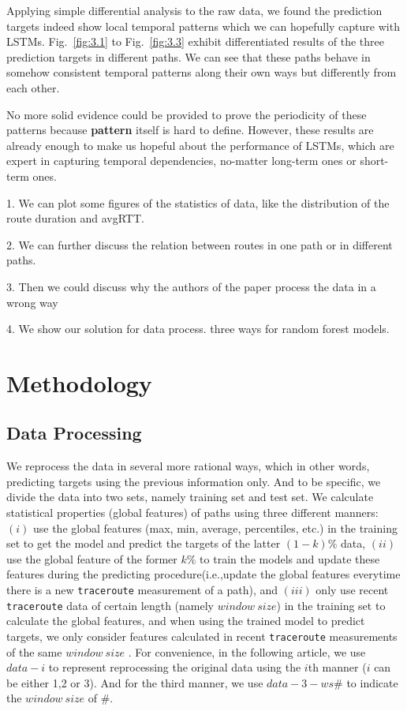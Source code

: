 \documentclass[sigconf]{acmart}
\begin{document}
	Applying simple differential analysis to the raw data, we found the prediction targets indeed show local temporal patterns which we can hopefully capture with LSTMs. Fig.~\ref{fig:3.1} to Fig.~\ref{fig:3.3} exhibit differentiated results of the three prediction targets in different paths. We can see that these paths behave in somehow consistent temporal patterns along their own ways but differently from each other.
	
	No more solid evidence could be provided to prove the periodicity of these patterns because \textbf{pattern} itself is hard to define. However, these results are already enough to make us hopeful about the performance of LSTMs, which are expert in capturing temporal dependencies, no-matter long-term ones or short-term ones.
	
	
	1. We can plot some figures of the statistics of data, like the distribution of the route duration and avgRTT. 
	
	2. We can further discuss the relation between routes in one path or in different paths.
	
	3. Then we could discuss why the authors of the paper process the data in a wrong way
	
	4. We show our solution for data process. three ways for random forest models.
	
	
	\section{Methodology}
	\subsection{Data Processing}
	We reprocess the data in several more rational ways, which in other words, predicting targets using the previous information only. And to be specific, we divide the data into two sets, namely training set and test set. We calculate statistical properties (global features) of paths using three different manners: $(i)$ use the global features (max, min, average, percentiles, etc.) in the training set to get the model and predict the targets of the latter $(1-k)\%$ data, $(ii)$ use the global feature of the former $k\%$ to train the models and update these features during the predicting procedure(i.e.,update the global features everytime there is a new \texttt{traceroute} measurement of a path), and $(iii)$ only use recent \texttt{traceroute} data of certain length (namely $window\ size$) in the training set to calculate the global features, and when using the trained model to predict targets, we only consider features calculated in  recent \texttt{traceroute} measurements of the same $window\ size$ . For convenience, in the following article, we use $data-i$ to represent reprocessing the original data using the $i$th manner ($i$ can be either 1,2 or 3). And for the third manner, we use $data-3-ws\#$ to indicate the $window\ size$ of $\#$.
	
\end{document}
